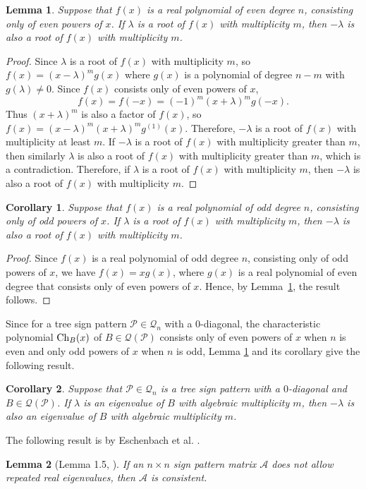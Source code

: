 \documentclass[a4paper, 10pt]{article}
\newtheorem{lemma}{Lemma}[section]
\newtheorem{cor}{Corollary}[section]
\numberwithin{equation}{section}
\def\Ch{{\rm Ch}}
\begin{document}
	\begin{lemma} \label{lem1}
		Suppose that $f(x)$ is a real polynomial of even degree $n$, consisting only of even powers of $x$. If $\lambda$ is a root of $f(x)$ with multiplicity $m$, then $-\lambda$ is also a root of $f(x)$ with multiplicity $m$.
	\end{lemma}
	\begin{proof}
		Since $\lambda$ is a root of $f(x)$ with multiplicity $m$, so $f(x)=(x-\lambda)^mg(x)$ where $g(x)$ is a polynomial of degree $n-m$ with $g(\lambda)\neq 0$. Since $f(x)$ consists only of even powers of $x$, $$f(x)=f(-x)=(-1)^m(x+\lambda)^mg(-x).$$
		Thus $(x+\lambda)^m$ is also a factor of $f(x)$, so $f(x)=(x-\lambda)^m(x+\lambda)^mg^{(1)}(x)$. Therefore, $-\lambda$ is a root of $f(x)$ with multiplicity at least $m$. If $-\lambda$ is a root of $f(x)$ with multiplicity greater than $m$, then similarly $\lambda$ is also a root of $f(x)$ with multiplicity greater than $m$, which is a contradiction. Therefore, if $\lambda$ is a root of $f(x)$ with multiplicity $m$, then $-\lambda$ is also a root of $f(x)$ with multiplicity $m$.
	\end{proof}
	
	\begin{cor} \label{xlem1}
		Suppose that $f(x)$ is a real polynomial of odd degree $n$, consisting only of odd powers of $x$. If $\lambda$ is a root of $f(x)$ with multiplicity $m$, then $-\lambda$ is also a root of $f(x)$ with multiplicity $m$.
	\end{cor}
	\begin{proof}
		Since $f(x)$ is a real polynomial of odd degree $n$, consisting only of odd powers of $x$, we have $f(x)=xg(x)$, where $g(x)$ is a real polynomial of even degree that consists only of even powers of $x$. Hence, by Lemma~\ref{lem1}, the result follows.
	\end{proof}
	
	
	Since for a tree sign pattern $\mathcal{P} \in \mathcal{Q}_n$ with a $0$-diagonal, the characteristic polynomial $\Ch_B(x)$ of $B \in \mathcal{Q}(\mathcal{P})$ consists only of even powers of $x$ when $n$ is even and only odd powers of $x$ when $n$ is odd, Lemma \ref{lem1} and its corollary give the following result.
	\begin{cor}\label{c1}
		Suppose that $\mathcal{P}\in \mathcal{Q}_n$ is a tree sign pattern with a $0$-diagonal and $B\in \mathcal{Q}(\mathcal{P})$. If $\lambda$ is an eigenvalue of $B$ with algebraic multiplicity $m$, then $-\lambda$ is also an eigenvalue of $B$ with algebraic multiplicity $m$.
	\end{cor}
	The following result is by Eschenbach et al. \cite{1}.
	\begin{lemma}[Lemma 1.5, \cite{1}] \label{l1}
		If an $n\times n$ sign pattern matrix $\mathcal{A}$ does not allow repeated real eigenvalues, then $\mathcal{A}$ is consistent.
	\end{lemma}
	
\end{document}
